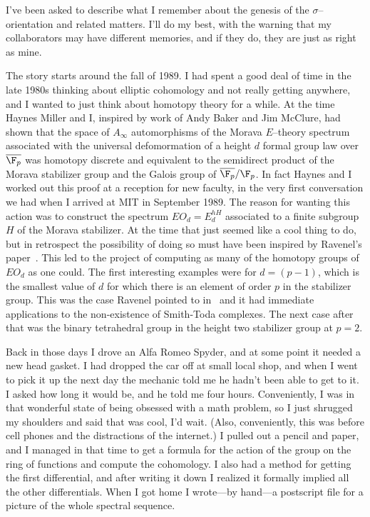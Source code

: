 
I've been asked to describe what I remember about the genesis of the
$\sigma$--orientation and related matters.  I'll do my best, with the
warning that my collaborators may have different memories, and if they do,
they are just as right as mine.

The story starts around the fall of 1989.  I had spent a good deal of
time in the late 1980s thinking about elliptic cohomology and not
really getting anywhere, and I wanted to just think about homotopy
theory for a while.  At the time Haynes Miller and I, inspired by work
of Andy Baker and Jim McClure, had shown that the space of
$A_{\infty}$ automorphisms of the Morava $E$--theory spectrum
associated with the universal defomormation of a height $d$ formal
group law over $\overline{\F_{p}}$ was homotopy discrete and equivalent to
the semidirect product of the Morava stabilizer group and the Galois
group of $\overline{\F_{p}}/\F_{p}$.  In fact Haynes and I worked out this
proof at a reception for new faculty, in the very first conversation
we had when I arrived at MIT in September 1989.  The reason for
wanting this action was to construct the spectrum $EO_{d}=E_{d}^{hH}$
associated to a finite subgroup $H$ of the Morava stabilizer.  At the
time that just seemed like a cool thing to do, but in retrospect the
possibility of doing so must have been inspired by Ravenel's
paper~\cite{RavenelNonexistenceArfInvariantElts}.  This led to the project of computing as many of
the homotopy groups of $EO_{d}$ as one could.  The first interesting
examples were for $d=(p-1)$, which is the smallest value of $d$ for
which there is an element of order $p$ in the stabilizer group.  This
was the case Ravenel pointed to in~\cite{RavenelNonexistenceArfInvariantElts} and it had immediate
applications to the non-existence of Smith-Toda complexes.  The next
case after that was the binary tetrahedral group in the height two
stabilizer group at $p=2$.

Back in those days I drove an Alfa Romeo Spyder, and at some point it
needed a new head gasket.  I had dropped the car off at small local
shop, and when I went to pick it up the next day the mechanic told me
he hadn't been able to get to it.  I asked how long it would be, and he
told me four hours.  Conveniently, I was in that wonderful state of being
obsessed with a math problem, so I just shrugged my shoulders and said
that was cool, I'd wait.  (Also, conveniently, this was before cell
phones and the distractions of the internet.)  I pulled out a pencil
and paper, and I managed in that time to get a formula for the action of
the group on the ring of functions and compute the cohomology.  I also
had a method for getting the first differential, and after writing it
down I realized it formally implied all the other differentials.  When
I got home I wrote---by hand---a postscript file for a picture of the
whole spectral sequence.

